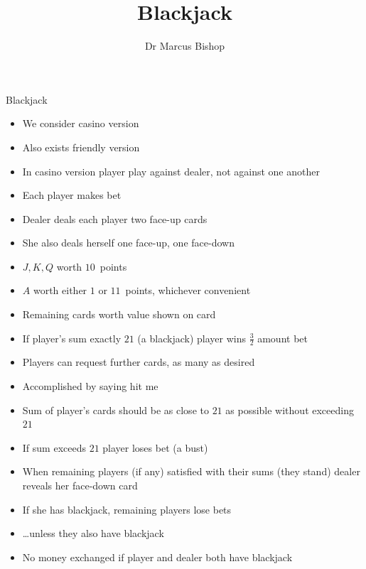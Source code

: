 \documentclass[handout]{beamer}
\title[Blackjack]{Blackjack}
\author{Dr Marcus Bishop}
\theoremstyle{definition}
\begin{document}
\begin{frame}\titlepage\end{frame}
\LogoOff

\begin{frame}{Blackjack}
\begin{itemize}
\item We consider casino version
\item Also exists friendly version
\item In casino version player play against dealer, not against one another
\item Each player makes bet
\item Dealer deals each player two face-up cards
\item She also deals herself one face-up, one face-down
\item $J,K,Q$ worth $10$~points
\item $A$ worth either $1$ or $11$~points, whichever convenient
\item Remaining cards worth value shown on card
\end{itemize}
\end{frame}

\begin{frame}
\begin{itemize}
\item If player's sum exactly $21$ (a \alert{blackjack}) player wins
$\frac{3}{2}$ amount bet
\item Players can request further cards, as many as desired
\item Accomplished by saying \alert{hit me}
\item Sum of player's cards should be as close to $21$ as possible
without exceeding $21$
\item If sum exceeds $21$ player loses bet (a \alert{bust})
\item When remaining players (if any) satisfied with their sums
(they \alert{stand}) dealer reveals her
face-down card
\item If she has blackjack, remaining players lose bets
\item \dots unless they also have blackjack
\item No money exchanged if player and dealer both have blackjack
\end{itemize}
\end{frame}
\end{document}
